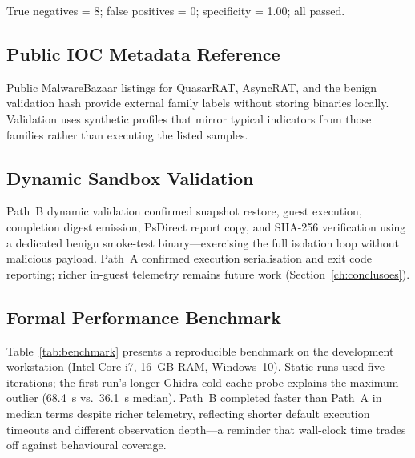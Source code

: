 \noindent\small
True negatives = 8; false positives = 0; specificity = 1.00; all passed.

\subsection{Public IOC Metadata Reference}

Public MalwareBazaar listings for QuasarRAT, AsyncRAT, and the benign validation hash provide
external family labels without storing binaries locally. Validation uses synthetic profiles that
mirror typical indicators from those families rather than executing the listed samples.

\subsection{Dynamic Sandbox Validation}

Path~B dynamic validation confirmed snapshot restore, guest execution, completion digest emission,
PsDirect report copy, and SHA-256 verification using a dedicated benign smoke-test binary---exercising
the full isolation loop without malicious payload. Path~A confirmed execution serialisation and exit
code reporting; richer in-guest telemetry remains future work (Section~\ref{ch:conclusoes}).

\subsection{Formal Performance Benchmark}

Table~\ref{tab:benchmark} presents a reproducible benchmark on the development workstation
(Intel Core i7, 16~GB RAM, Windows~10). Static runs used five iterations; the first run's longer
Ghidra cold-cache probe explains the maximum outlier (68.4~s vs.\ 36.1~s median). Path~B completed
faster than Path~A in median terms despite richer telemetry, reflecting shorter default execution
timeouts and different observation depth---a reminder that wall-clock time trades off against
behavioural coverage.

